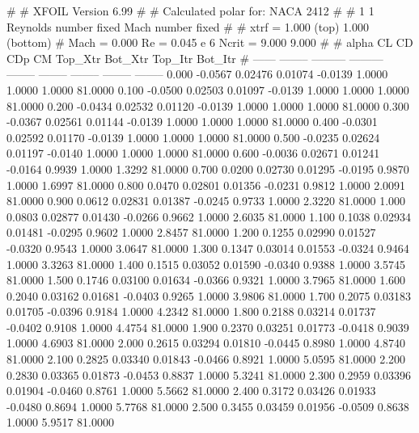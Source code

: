 #  
#       XFOIL         Version 6.99
#  
# Calculated polar for: NACA 2412                                       
#  
# 1 1 Reynolds number fixed          Mach number fixed         
#  
# xtrf =   1.000 (top)        1.000 (bottom)  
# Mach =   0.000     Re =     0.045 e 6     Ncrit =   9.000  9.000
#  
#   alpha    CL        CD       CDp       CM     Top_Xtr  Bot_Xtr  Top_Itr  Bot_Itr
#  ------ -------- --------- --------- -------- -------- -------- -------- --------
   0.000  -0.0567   0.02476   0.01074  -0.0139   1.0000   1.0000   1.0000  81.0000
   0.100  -0.0500   0.02503   0.01097  -0.0139   1.0000   1.0000   1.0000  81.0000
   0.200  -0.0434   0.02532   0.01120  -0.0139   1.0000   1.0000   1.0000  81.0000
   0.300  -0.0367   0.02561   0.01144  -0.0139   1.0000   1.0000   1.0000  81.0000
   0.400  -0.0301   0.02592   0.01170  -0.0139   1.0000   1.0000   1.0000  81.0000
   0.500  -0.0235   0.02624   0.01197  -0.0140   1.0000   1.0000   1.0000  81.0000
   0.600  -0.0036   0.02671   0.01241  -0.0164   0.9939   1.0000   1.3292  81.0000
   0.700   0.0200   0.02730   0.01295  -0.0195   0.9870   1.0000   1.6997  81.0000
   0.800   0.0470   0.02801   0.01356  -0.0231   0.9812   1.0000   2.0091  81.0000
   0.900   0.0612   0.02831   0.01387  -0.0245   0.9733   1.0000   2.3220  81.0000
   1.000   0.0803   0.02877   0.01430  -0.0266   0.9662   1.0000   2.6035  81.0000
   1.100   0.1038   0.02934   0.01481  -0.0295   0.9602   1.0000   2.8457  81.0000
   1.200   0.1255   0.02990   0.01527  -0.0320   0.9543   1.0000   3.0647  81.0000
   1.300   0.1347   0.03014   0.01553  -0.0324   0.9464   1.0000   3.3263  81.0000
   1.400   0.1515   0.03052   0.01590  -0.0340   0.9388   1.0000   3.5745  81.0000
   1.500   0.1746   0.03100   0.01634  -0.0366   0.9321   1.0000   3.7965  81.0000
   1.600   0.2040   0.03162   0.01681  -0.0403   0.9265   1.0000   3.9806  81.0000
   1.700   0.2075   0.03183   0.01705  -0.0396   0.9184   1.0000   4.2342  81.0000
   1.800   0.2188   0.03214   0.01737  -0.0402   0.9108   1.0000   4.4754  81.0000
   1.900   0.2370   0.03251   0.01773  -0.0418   0.9039   1.0000   4.6903  81.0000
   2.000   0.2615   0.03294   0.01810  -0.0445   0.8980   1.0000   4.8740  81.0000
   2.100   0.2825   0.03340   0.01843  -0.0466   0.8921   1.0000   5.0595  81.0000
   2.200   0.2830   0.03365   0.01873  -0.0453   0.8837   1.0000   5.3241  81.0000
   2.300   0.2959   0.03396   0.01904  -0.0460   0.8761   1.0000   5.5662  81.0000
   2.400   0.3172   0.03426   0.01933  -0.0480   0.8694   1.0000   5.7768  81.0000
   2.500   0.3455   0.03459   0.01956  -0.0509   0.8638   1.0000   5.9517  81.0000
